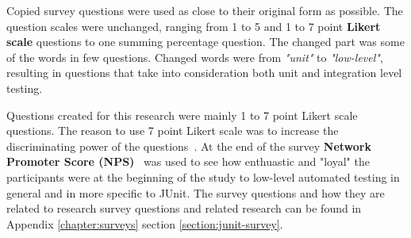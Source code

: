     Copied survey questions were used as close to their original form as possible.
    The question scales were unchanged, ranging from 1 to 5 and 1 to 7 point \textbf{Likert scale} questions
    to one summing percentage question. The changed part was some of the words in few questions.
    Changed words were from \textit{"unit"} to \textit{"low-level"},
    resulting in questions that take into consideration both unit and integration level testing.

    Questions created for this research were mainly 1 to 7 point Likert scale questions.
    The reason to use 7 point Likert scale was to increase the discriminating power of the questions~\cite{cummins2000we}.
    At the end of the survey \textbf{Network Promoter Score (NPS)}~\cite{reichheld2003one} was used to see how enthuastic and "loyal" the participants
    were at the beginning of the study to low-level automated testing in general and in more specific to JUnit.
    The survey questions and how they are related to research survey questions and related research can be found
    in Appendix \ref{chapter:surveys} section \ref{section:junit-survey}.

